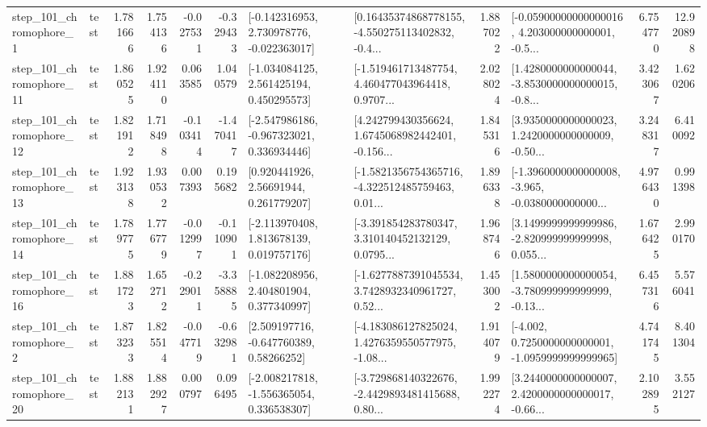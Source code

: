 \begin{tabular}{llrrrrllrlrr}
   step\_101\_chromophore\_1 &      test &      1.781666 &    1.754136 &     -0.027531 & -0.329433 &   [-0.142316953, 2.730978776, -0.022363017] &  [0.16435374868778155, -4.550275113402832, -0.4... &       1.887022 &  [-0.05900000000000016, 4.203000000000001, -0.5... &            6.754770 &         12.920898 \\
  step\_101\_chromophore\_11 &      test &      1.860525 &    1.924110 &      0.063585 &  1.040579 &    [-1.034084125, 2.561425194, 0.450295573] &  [-1.519461713487754, 4.460477043964418, 0.9707... &       2.028024 &  [1.4280000000000044, -3.8530000000000015, -0.8... &            3.423067 &          1.620206 \\
  step\_101\_chromophore\_12 &      test &      1.821912 &    1.718498 &     -0.103414 & -1.470417 &   [-2.547986186, -0.967323021, 0.336934446] &  [4.242799430356624, 1.6745068982442401, -0.156... &       1.845316 &  [3.9350000000000023, 1.2420000000000009, -0.50... &            3.248317 &          6.410092 \\
  step\_101\_chromophore\_13 &      test &      1.923138 &    1.930532 &      0.007393 &  0.195682 &      [0.920441926, 2.56691944, 0.261779207] &  [-1.5821356754365716, -4.322512485759463, 0.01... &       1.896338 &  [-1.3960000000000008, -3.965, -0.0380000000000... &            4.976430 &          0.991398 \\
  step\_101\_chromophore\_14 &      test &      1.789775 &    1.776779 &     -0.012997 & -0.110901 &    [-2.113970408, 1.813678139, 0.019757176] &  [-3.391854283780347, 3.310140452132129, 0.0795... &       1.968746 &  [3.1499999999999986, -2.820999999999998, 0.055... &            1.676425 &          2.990170 \\
  step\_101\_chromophore\_16 &      test &      1.881723 &    1.652712 &     -0.229011 & -3.358885 &    [-1.082208956, 2.404801904, 0.377340997] &  [-1.6277887391045534, 3.7428932340961727, 0.52... &       1.453002 &  [1.5800000000000054, -3.780999999999999, -0.13... &            6.457316 &          5.576041 \\
   step\_101\_chromophore\_2 &      test &      1.873233 &    1.825514 &     -0.047719 & -0.632981 &     [2.509197716, -0.647760389, 0.58266252] &  [-4.183086127825024, 1.4276359550577975, -1.08... &       1.914079 &  [-4.002, 0.7250000000000001, -1.0959999999999965] &            4.741745 &          8.401304 \\
  step\_101\_chromophore\_20 &      test &      1.882131 &    1.882927 &      0.000797 &  0.096495 &   [-2.008217818, -1.556365054, 0.336538307] &  [-3.729868140322676, -2.4429893481415688, 0.80... &       1.992274 &  [3.2440000000000007, 2.4200000000000017, -0.66... &            2.102895 &          3.552127 \\

\end{tabular}
